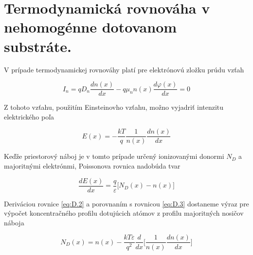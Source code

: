 
\chapter{Termodynamická rovnováha v nehomogénne dotovanom substráte.} %

\label{app:AppendixD} %


V prípade termodynamickej rovnováhy platí pre elektrónovú zložku prúdu
vzťah

\begin{equation}\label{eq:D.1}
I_n = qD_n\frac{dn(x)}{dx} - q\mu_{n}n(x) \frac{d\varphi(x)}{dx} = 0
\end{equation}

Z tohoto vzťahu, použitím Einsteinovho vzťahu, možno vyjadriť
intenzitu elektrického poľa

\begin{equation}\label{eq:D.2}
E(x) = - \frac{kT}{q} \frac{1}{n(x)} \frac{dn(x)}{dx}
\end{equation}

Keďže priestorový náboj je v tomto prípade určený ionizovanými donormi
$N_D$ a majoritnými elektrónmi, Poissonova rovnica nadobúda tvar

\begin{equation}\label{eq:D.3}
\frac{dE(x)}{dx} = \frac{q}{\varepsilon} \big[N_D(x) - n(x)\big]
\end{equation}

Deriváciou rovnice \ref{eq:D.2} a porovnaním s rovnicou \ref{eq:D.3}
dostaneme výraz pre výpočet koncentračného profilu dotujúcich atómov z
profilu majoritných nosičov náboja

\begin{equation}\label{eq:D.4}
N_D(x) = n(x) - \frac{kT\varepsilon}{q^2} \frac{d}{dx} \bigg[\frac{1}{n(x)} \frac{dn(x)}{dx}\bigg]
\end{equation}

